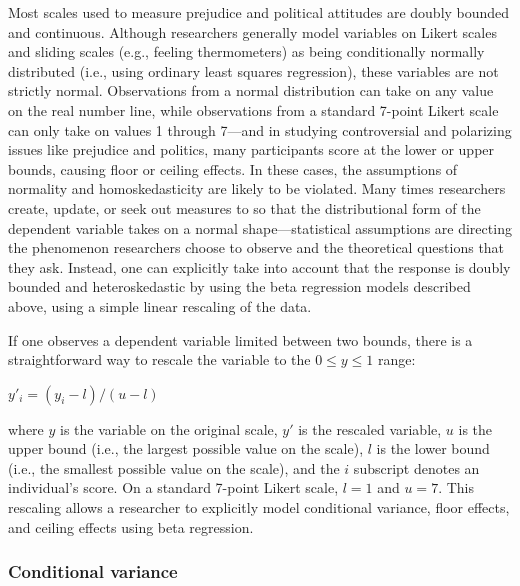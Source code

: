 \documentclass[english,man]{apa6}
\theoremstyle{definition}
\theoremstyle{definition}
\theoremstyle{remark}
\begin{document}
Most scales used to measure prejudice and political attitudes are doubly
bounded and continuous. Although researchers generally model variables
on Likert scales and sliding scales (e.g., feeling thermometers) as
being conditionally normally distributed (i.e., using ordinary least
squares regression), these variables are not strictly normal.
Observations from a normal distribution can take on any value on the
real number line, while observations from a standard 7-point Likert
scale can only take on values 1 through 7---and in studying
controversial and polarizing issues like prejudice and politics, many
participants score at the lower or upper bounds, causing floor or
ceiling effects. In these cases, the assumptions of normality and
homoskedasticity are likely to be violated. Many times researchers
create, update, or seek out measures to so that the distributional form
of the dependent variable takes on a normal shape---statistical
assumptions are directing the phenomenon researchers choose to observe
and the theoretical questions that they ask. Instead, one can explicitly
take into account that the response is doubly bounded and
heteroskedastic by using the beta regression models described above,
using a simple linear rescaling of the data.

If one observes a dependent variable limited between two bounds, there
is a straightforward way to rescale the variable to the
\(0 \leq y \leq 1\) range:

\begin{center}
$y'_i = (y_i - l) / (u - l)$
\end{center}

where \(y\) is the variable on the original scale, \(y'\) is the
rescaled variable, \(u\) is the upper bound (i.e., the largest possible
value on the scale), \(l\) is the lower bound (i.e., the smallest
possible value on the scale), and the \(i\) subscript denotes an
individual's score. On a standard 7-point Likert scale, \(l = 1\) and
\(u = 7\). This rescaling allows a researcher to explicitly model
conditional variance, floor effects, and ceiling effects using beta
regression.

\subsubsection{Conditional variance}\label{conditional-variance}
\end{document}

